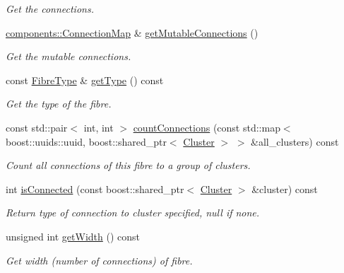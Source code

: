 \begin{DoxyCompactItemize}
\begin{DoxyCompactList}\small\item\em \-Get the connections. \end{DoxyCompactList}\item 
\hyperlink{classcryomesh_1_1components_1_1ConnectionMap}{components\-::\-Connection\-Map} \& \hyperlink{classcryomesh_1_1structures_1_1Fibre_a9c35ba56c134e32142cc552e059419d0}{get\-Mutable\-Connections} ()
\begin{DoxyCompactList}\small\item\em \-Get the mutable connections. \end{DoxyCompactList}\item 
const \hyperlink{classcryomesh_1_1structures_1_1Fibre_aecbba6d46a76f888b3722491b674f5e4}{\-Fibre\-Type} \& \hyperlink{classcryomesh_1_1structures_1_1Fibre_ab1a8a60a116108041a1efea8fd6c35e7}{get\-Type} () const 
\begin{DoxyCompactList}\small\item\em \-Get the type of the fibre. \end{DoxyCompactList}\item 
const std\-::pair$<$ int, int $>$ \hyperlink{classcryomesh_1_1structures_1_1Fibre_aa4b6fd784dad6f0e0ac48b33ac0c574a}{count\-Connections} (const std\-::map$<$ boost\-::uuids\-::uuid, boost\-::shared\-\_\-ptr$<$ \hyperlink{classcryomesh_1_1structures_1_1Cluster}{\-Cluster} $>$ $>$ \&all\-\_\-clusters) const 
\begin{DoxyCompactList}\small\item\em \-Count all connections of this fibre to a group of clusters. \end{DoxyCompactList}\item 
int \hyperlink{classcryomesh_1_1structures_1_1Fibre_af32b67f092190a1a0b3dcc1b4156aaf0}{is\-Connected} (const boost\-::shared\-\_\-ptr$<$ \hyperlink{classcryomesh_1_1structures_1_1Cluster}{\-Cluster} $>$ \&cluster) const 
\begin{DoxyCompactList}\small\item\em \-Return type of connection to cluster specified, null if none. \end{DoxyCompactList}\item 
unsigned int \hyperlink{classcryomesh_1_1structures_1_1Fibre_a042a1f3fce5c5938eb229764a5754a0f}{get\-Width} () const 
\begin{DoxyCompactList}\small\item\em \-Get width (number of connections) of fibre. \end{DoxyCompactList}\item 

\end{DoxyCompactItemize}

